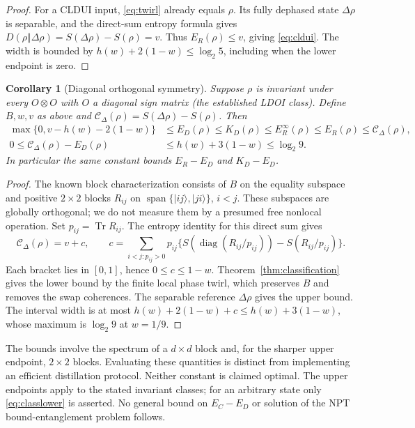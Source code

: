 \documentclass[11pt]{article}
\newtheorem{corollary}[theorem]{Corollary}
\newcommand{\Tr}{\operatorname{Tr}}
\begin{document}
\begin{proof}
For a CLDUI input, \eqref{eq:twirl} already equals $\rho$.
Its fully dephased state $\Delta\rho$ is separable, and the direct-sum
entropy formula gives
$D(\rho\Vert\Delta\rho)=S(\Delta\rho)-S(\rho)=v$.
Thus $E_R(\rho)\le v$, giving \eqref{eq:cldui}.
The width is bounded by $h(w)+2(1-w)\le\log_2 5$,
including when the lower endpoint is zero.
\end{proof}

\begin{corollary}[Diagonal orthogonal symmetry]\label{cor:ldoi}
Suppose $\rho$ is invariant under every $O\otimes O$ with $O$ a
diagonal sign matrix (the established LDOI class). Define $B,w,v$ as
above and $\mathcal C_\Delta(\rho)=S(\Delta\rho)-S(\rho)$.
Then
\begin{align}
 \max\{0,v-h(w)-2(1-w)\}&\le E_D(\rho)\le K_D(\rho)
 \le E_R^\infty(\rho)\le E_R(\rho)\le\mathcal C_\Delta(\rho),\label{eq:ldoi}\\
 0\le\mathcal C_\Delta(\rho)-E_D(\rho)&\le h(w)+3(1-w)\le\log_2 9.
 \label{eq:log9}
\end{align}
In particular the same constant bounds $E_R-E_D$ and $K_D-E_D$.
\end{corollary}
\begin{proof}
The known block characterization \cite[Proposition 2.2 and equations
(5)--(8)]{sn} consists of $B$ on the equality subspace and positive
$2\times2$ blocks $R_{ij}$ on $\operatorname{span}\{|ij\rangle,|ji\rangle\}$,
$i<j$. These subspaces are globally orthogonal; we do not measure
them by a presumed free nonlocal operation. Set $p_{ij}=\Tr R_{ij}$.
The entropy identity for this direct sum gives
\[
 \mathcal C_\Delta(\rho)=v+c,\qquad
 c=\sum_{i<j:p_{ij}>0}p_{ij}
 \{S(\operatorname{diag}(R_{ij}/p_{ij}))-S(R_{ij}/p_{ij})\}.
\]
Each bracket lies in $[0,1]$, hence $0\le c\le1-w$.
Theorem~\ref{thm:classification} gives the lower bound by the finite
local phase twirl, which preserves $B$ and removes the swap coherences.
The separable reference $\Delta\rho$ gives the upper bound.
The interval width is at most $h(w)+2(1-w)+c\le h(w)+3(1-w)$,
whose maximum is $\log_2 9$ at $w=1/9$.
\end{proof}
The bounds involve the spectrum of a $d\times d$ block and, for the
sharper upper endpoint, $2\times2$ blocks. Evaluating these quantities
is distinct from implementing an efficient distillation protocol.
Neither constant is claimed optimal. The upper endpoints apply to
the stated invariant classes; for an arbitrary state only
\eqref{eq:classlower} is asserted. No general bound on $E_C-E_D$
or solution of the NPT bound-entanglement problem follows.
\end{document}
